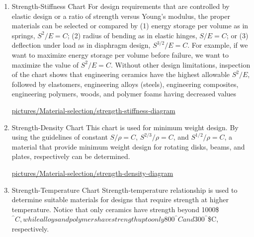 \documentclass[a4paper,openany,12pt]{book}
\begin{document}
\begin{enumerate}
\item Strength-Stiffness Chart
\label{sec:orge0319b4}
For design requirements that are controlled by elastic design or a ratio
of strength versus Young's modulus, the proper materials can be selected
or compared by (1) energy storage per volume as in springs, \(S^2/E = C\);
(2) radius of bending as in elastic hinges, \(S/E = C\); or (3) deflection
under load as in diaphragm design, \(S^{3/2}/E = C\). For example, if we
want to maximize energy storage per volume before failure, we want to
maximize the value of \(S^2/E = C\). Without other design limitations,
inspection of the chart shows that engineering ceramics have the highest
allowable \(S^2/E\), followed by elastomers, engineering alloys (steels),
engineering composites, engineering polymers, woods, and polymer foams
having decreased values


\cite{ashby2010materials}
\url{pictures/Material-selection/strength-stiffness-diagram}

\item Strength-Density Chart
\label{sec:orgc56cb1a}
This chart is used for minimum weight design. By using the guidelines of
constant \(S/\rho = C\), \(S^{2/3}/\rho = C\), and \(S^{1/2}/\rho = C\), a
material that provide minimum weight design for rotating disks, beams,
and plates, respectively can be determined.


\url{pictures/Material-selection/strength-density-diagram}

\item Strength-Temperature Chart
\label{sec:org89115ba}
Strength-temperature relationship is used to determine suitable
materials for designs that require strength at higher temperature.
Notice that only ceramics have strength beyond 1000\$\(^{\^{}} C, while
alloys and polymers have strength up to only 800\)\(^{\^{}} C and
300\)\(^{\^{}}\)\$C, respectively.



\end{enumerate}
\end{document}
